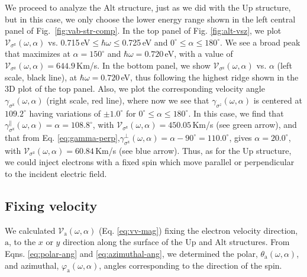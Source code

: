 \documentclass[floatfix,prb,aps,superscriptaddress,showpacs,11pt,preprint,letterpaper]{revtex4}
\begin{document}
We proceed to analyze the Alt structure, just as we did with the Up structure,
but in this case, we only choose the lower energy range shown in the left
central panel of Fig.~\ref{fig:vab-str-comp}. In the top panel of Fig. 
\ref{fig:alt-vsz}, we plot $\mathcal{V}_{\sigma^{\mathrm{z}}} (\omega,\alpha)$
vs. 0.715\,eV$\leq\hbar\omega\leq$0.725\,eV and $0^\circ\leq\alpha\leq
180^\circ$. We see a broad peak that maximizes at $\alpha=150^{\circ}$ and
$\hbar\omega= 0.720$\,eV, with a value of$\mathcal{V}_{\sigma^{\mathrm{z}}}
(\omega,\alpha) = 644.9$\,Km/s. In the bottom panel, we  show
$\mathcal{V}_{\sigma^{\mathrm{z}}} (\omega,\alpha)$ vs. $\alpha$ (left scale,
black line), at $\hbar\omega= 0.720$\,eV, thus following the highest ridge shown
in the 3D plot of the top panel. Also, we plot the corresponding velocity angle
$\gamma_{\sigma^\mathrm{z}} (\omega,\alpha)$ (right scale, red line), where now
we see that $\gamma_{\sigma^z}(\omega,\alpha)$ is centered at $109.2^{\circ}$
having variations of $\pm 1.0^{\circ}$ for $0^{\circ} \leq \alpha \leq 180^
{\circ}$. In this case, we find that $\gamma^\parallel_{\sigma^\mathrm{z}}
(\omega,\alpha) = \alpha = 108.8^\circ$, with $\mathcal{V}_{\sigma^{\mathrm{z}}}
(\omega,\alpha) = 450.05$\,Km/s (see green arrow), and that from Eq. 
\eqref{eq:gamma-perp},$\gamma^\perp_{\sigma^\mathrm{z}}(\omega,\alpha) = 
\alpha-90^\circ=110.0^\circ$, gives $\alpha=20.0^\circ$, with $\mathcal{V}_
{\sigma^{\mathrm{z}}} (\omega,\alpha) = 60.84$\,Km/s (see blue arrow). Thus, as 
for the Up structure, we could inject electrons with a fixed spin which move
parallel or perpendicular to the incident electric field.

\subsection{Fixing velocity} 
\label{sec:res-fixvel}

We calculated $\mathcal{V}_{\mathrm{a}}(\omega,\alpha)$ (Eq. \eqref{eq:vv-mag})
fixing the electron velocity direction, $\mathrm{a}$, to the $x$ or $y$
direction along the surface of the Up and Alt structures. From Eqns.
\eqref{eq:polar-ang} and \eqref{eq:azimuthal-ang}, we determined the polar,
$\theta_{\mathrm{a}} (\omega,\alpha)$, and azimuthal, $\varphi_{\mathrm{a}}
(\omega,\alpha)$, angles corresponding to the direction of the spin.
\end{document}
